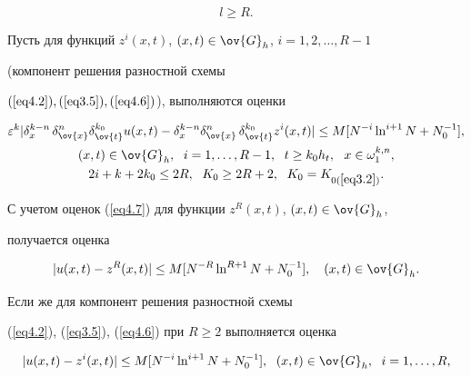 \begin{equation}


\label{eq4.6}


l\ge R.


\end{equation}


Пусть для функций $z^i(x,t)$, $(x,t)\in\ov{G}_h$, $i=1,2,\dotsc,R-1$


(компонент решения разностной схемы


$(\ref{eq4.2}), (\ref{eq3.5}), (\ref{eq4.6})$), выполняются оценки


\begin{gather}


\label{eq4.7}


\eps^{k}|\delta_x^{k-n}\,\delta^n_{\ov{x}}\delta_{\ov{t}}^{k_0}u(x,t)-


\delta^{k-n}_x\delta^n_{\ov{x}}\,\delta^{k_0}_{\ov{t}}z^i(x,t)|\le


M[N^{-i}\ln^{i+1}N+N_0^{-1}],\\


(x,t)\in\ov{G}_h,\ \; i=1,\dotsc,R-1, \ \; t\ge k_0h_t,


\ \ x\in\omega_1^{k,n}, \notag\\


2i+k+2k_0\le 2R,\ \; K_0\ge 2R+2,\ \; K_0=K_{0(\ref{eq3.2})}. \notag


\end{gather}


С учетом оценок (\ref{eq4.7}) для функции $z^R(x,t)$, $(x,t)\in\ov{G}_h$,


получается оценка


\begin{equation}


\label{eq4.8}


|u(x,t)-z^R(x,t)|\le M[N^{-R}\ln^{R+1}N+N_0^{-1}],\quad


(x,t)\in\ov{G}_h.


\end{equation}





Если же для компонент решения разностной схемы


(\ref{eq4.2}), (\ref{eq3.5}), (\ref{eq4.6}) при $R\ge 2$ выполняется оценка


\begin{equation}


\label{eq4.9}


|u(x,t)-z^i(x,t)|\le M[N^{-i}\ln^{i+1}N+N_0^{-1}], \ \;


(x,t)\in\ov{G}_h,\ \; i=1,\dotsc,R,


\end{equation}


